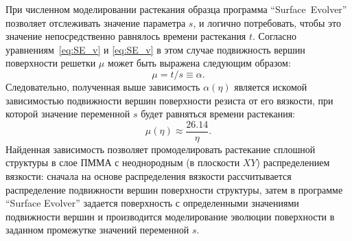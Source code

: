 При численном моделировании растекания образца программа ``Surface~Evolver'' позволяет отслеживать значение параметра $s$, и логично потребовать, чтобы это значение непосредственно равнялось времени растекания $t$.
Согласно уравнениям~\ref{eq:SE_v} и \ref{eq:SE_v} в этом случае подвижность вершин поверхности решетки $\mu$ может быть выражена следующим образом:
\begin{equation}
	\mu = t / s \equiv \alpha.
\end{equation}
Следовательно, полученная выше зависимость $\alpha(\eta)$ является искомой зависимостью подвижности вершин поверхности резиста от его вязкости, при которой значение переменной $s$ будет равняться времени растекания:
\begin{equation}
	\mu(\eta) \approx \frac{26.14}{\eta}.
\end{equation}
Найденная зависимость позволяет промоделировать растекание сплошной структуры в слое ПММА с неоднородным (в плоскости $XY$) распределением вязкости: сначала на основе распределения вязкости рассчитывается распределение подвижности вершин поверхности структуры, затем в программе ``Surface Evolver'' задается поверхность с определенными значениями подвижности вершин и производится моделирование эволюции поверхности в заданном промежутке значений переменной $s$.

